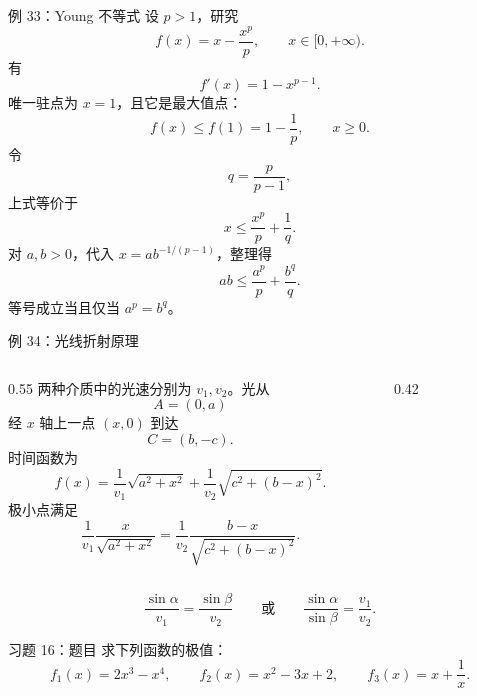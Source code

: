 \documentclass[aspectratio=169,10pt]{ctexbeamer}
\begin{document}
\begin{frame}[t]{例 33：Young 不等式}
\footnotesize
设 $p>1$，研究
\[
  f(x)=x-\frac{x^p}{p},\qquad x\in[0,+\infty).
\]
有
\[
  f'(x)=1-x^{p-1}.
\]
唯一驻点为 $x=1$，且它是最大值点：
\[
  f(x)\le f(1)=1-\frac1p,\qquad x\ge0.
\]
令
\[
  q=\frac{p}{p-1},
\]
上式等价于
\[
  x\le\frac{x^p}{p}+\frac1q.
\]
对 $a,b>0$，代入 $x=ab^{-1/(p-1)}$，整理得
\[
  \boxed{ab\le\frac{a^p}{p}+\frac{b^q}{q}.}
\]
等号成立当且仅当 $a^p=b^q$。
\end{frame}

\begin{frame}[t]{例 34：光线折射原理}
\small
\begin{columns}[T,onlytextwidth]
\begin{column}{0.55\textwidth}
两种介质中的光速分别为 $v_1,v_2$。光从
\[
  A=(0,a)
\]
经 $x$ 轴上一点 $(x,0)$ 到达
\[
  C=(b,-c).
\]
时间函数为
\[
  f(x)=\frac1{v_1}\sqrt{a^2+x^2}
      +\frac1{v_2}\sqrt{c^2+(b-x)^2}.
\]
极小点满足
\[
  \frac1{v_1}\frac{x}{\sqrt{a^2+x^2}}
  =
  \frac1{v_2}\frac{b-x}{\sqrt{c^2+(b-x)^2}}.
\]
\end{column}
\begin{column}{0.42\textwidth}
\begin{center}
\end{center}
\end{column}
\end{columns}

\[
  \boxed{\frac{\sin\alpha}{v_1}=\frac{\sin\beta}{v_2}}
  \qquad\text{或}\qquad
  \boxed{\frac{\sin\alpha}{\sin\beta}=\frac{v_1}{v_2}.}
\]
\end{frame}

\begin{frame}[t]{习题 16：题目}
\small
求下列函数的极值：
\[
  f_1(x)=2x^3-x^4,\qquad
  f_2(x)=x^2-3x+2,\qquad
  f_3(x)=x+\frac1x.
\]
\end{frame}
\end{document}
